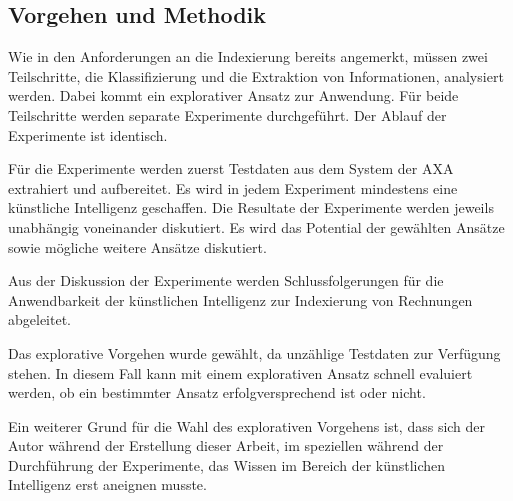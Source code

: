 \subsection{Vorgehen und Methodik}
\label{chap:vorgehen}

Wie in den Anforderungen an die Indexierung bereits angemerkt, müssen zwei Teilschritte, die Klassifizierung und die Extraktion von Informationen, analysiert werden. Dabei kommt ein explorativer Ansatz zur Anwendung. Für beide Teilschritte werden separate Experimente durchgeführt. Der Ablauf der Experimente ist identisch. 

Für die Experimente werden zuerst Testdaten aus dem System der AXA extrahiert und aufbereitet. Es wird in jedem Experiment mindestens eine künstliche Intelligenz geschaffen. Die Resultate der Experimente werden jeweils unabhängig voneinander diskutiert. Es wird das Potential der gewählten Ansätze sowie mögliche weitere Ansätze diskutiert.

Aus der Diskussion der Experimente werden Schlussfolgerungen für die Anwendbarkeit der künstlichen Intelligenz zur Indexierung von Rechnungen abgeleitet.

Das explorative Vorgehen wurde gewählt, da unzählige Testdaten zur Verfügung stehen. In diesem Fall kann mit einem explorativen Ansatz schnell evaluiert werden, ob ein bestimmter Ansatz erfolgversprechend ist oder nicht.

Ein weiterer Grund für die Wahl des explorativen Vorgehens ist, dass sich der Autor während der Erstellung dieser Arbeit, im speziellen während der Durchführung der Experimente, das Wissen im Bereich der künstlichen Intelligenz erst aneignen musste.





